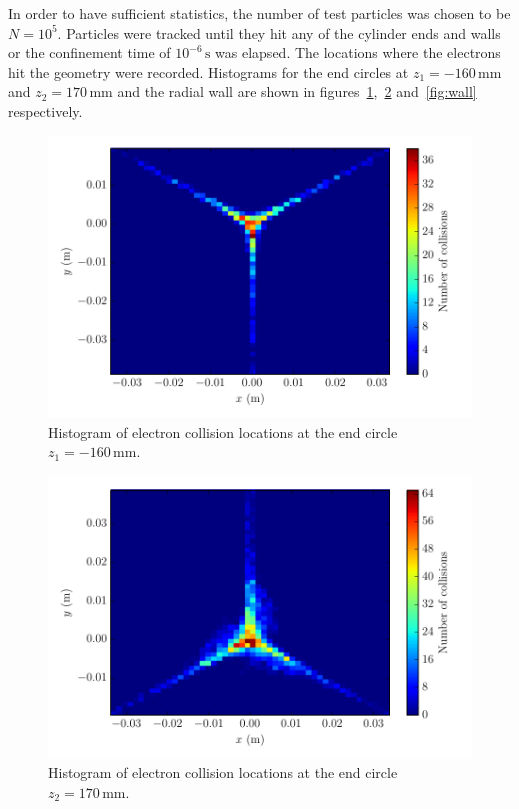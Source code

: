 \documentclass[12pt, a4paper]{article}
\begin{document}
In order to have sufficient statistics, the number of test particles was chosen to be $N=10^5$. Particles were tracked until they hit any of the cylinder ends and walls or the confinement time of $10^{-6}\,\si{\second}$ was elapsed. The locations where the electrons hit the geometry were recorded. Histograms for the end circles at $z_1 = -160\,\si{\milli\meter}$ and $z_2 = 170\,\si{\milli\meter}$ and the radial wall are shown in figures~\ref{fig:z_1_coll},~\ref{fig:z_2_coll} and~\ref{fig:wall} respectively.
\begin{figure}
    \centering
    \includegraphics{output/z1_collision_points.pdf}
    \caption{Histogram of electron collision locations at the end circle $z_1=-160\,\si{\milli\meter}$.}
    \label{fig:z_1_coll}
\end{figure}
\begin{figure}
    \centering
    \includegraphics{output/z2_collision_points.pdf}
    \caption{Histogram of electron collision locations at the end circle $z_2=170\,\si{\milli\meter}$.}
    \label{fig:z_2_coll}
\end{figure}
\end{document}
